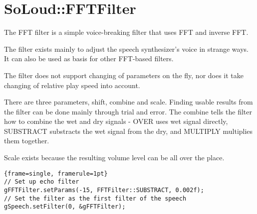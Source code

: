 
\chapter{SoLoud::FFTFilter}

The FFT filter is a simple voice-breaking filter that uses FFT and inverse FFT.

The filter exists mainly to adjust the speech synthesizer's voice in strange ways. It can also be used as basis for other FFT-based filters.

The filter does not support changing of parameters on the fly, nor does it take changing of relative play speed into account.

There are three parameters, shift, combine and scale. Finding usable results from the filter can be done mainly through trial and error. The combine tells the filter how to combine the wet and dry signals - OVER uses wet signal directly, SUBSTRACT substracts the wet signal from the dry, and MULTIPLY multiplies them together.

Scale exists because the resulting volume level can be all over the place.

\begin{lstlisting}{frame=single, framerule=1pt}
// Set up echo filter
gFFTFilter.setParams(-15, FFTFilter::SUBSTRACT, 0.002f);  
// Set the filter as the first filter of the speech
gSpeech.setFilter(0, &gFFTFilter); 
\end{lstlisting}
